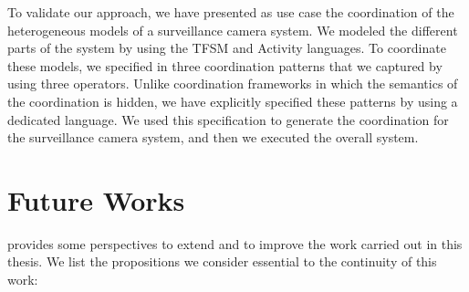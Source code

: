 To validate our approach, we have presented as use case the coordination of the heterogeneous models of a surveillance camera system. We modeled the different parts of the system by using the TFSM and Activity languages. To coordinate these models, we specified in \bcool three coordination patterns that we captured by using three operators. Unlike coordination frameworks in which the semantics of the coordination is hidden, we have explicitly specified these patterns by using a dedicated language. We used this specification to generate the coordination for the surveillance camera system, and then we executed the overall system.


	  
\section{Future Works}
\bcool provides some perspectives to extend and to improve the work carried out in this thesis. We list the propositions we consider essential to the continuity of this work:

